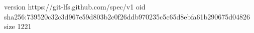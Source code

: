 version https://git-lfs.github.com/spec/v1
oid sha256:739520c32c3d967e59d803b2c0f26ddb970235c5c65d8ebfa61b290675d04826
size 1221
